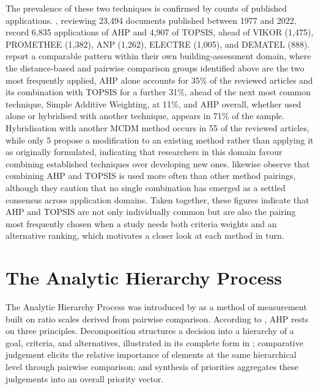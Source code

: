 The prevalence of these two techniques is confirmed by counts of published applications.
\textcite{basilio_systematic_2022}, reviewing 23{,}494 documents published between 1977 and 2022,
record 6{,}835 applications of AHP and 4{,}907 of TOPSIS, ahead of VIKOR (1{,}475), PROMETHEE
(1{,}382), ANP (1{,}262), ELECTRE (1{,}005), and DEMATEL (888).
\textcite{villalba_review_2024} report a comparable pattern within their own building-assessment
domain, where the distance-based and pairwise comparison groups identified above are the two most
frequently applied, AHP alone accounts for 35\% of the reviewed articles and its combination with
TOPSIS for a further 31\%, ahead of the next most common technique, Simple Additive Weighting, at
11\%, and AHP overall, whether used alone or hybridised with another technique, appears in 71\% of
the sample.
Hybridisation with another MCDM method occurs in 55 of the reviewed articles, while only 5 propose
a modification to an existing method rather than applying it as originally formulated, indicating
that researchers in this domain favour combining established techniques over developing new ones.
\textcite{tighnavard_balasbaneh_systematic_2025} likewise observe that combining AHP and TOPSIS is
used more often than other method pairings, although they caution that no single combination has
emerged as a settled consensus across application domains. Taken together, these figures indicate
that AHP and TOPSIS are not only individually common but are also the pairing most frequently
chosen when a study needs both criteria weights and an alternative ranking, which motivates a
closer look at each method in turn.

\section{The Analytic Hierarchy Process}\label{sec:ahp-theory}

The Analytic Hierarchy Process was introduced by \textcite{saaty_analytic_1987} as a method of
measurement built on ratio scales derived from pairwise comparison. According to \textcite{zyoud_bibliometric-based_2017},
AHP rests on three principles. Decomposition structures a decision into a hierarchy of a
goal, criteria, and alternatives, illustrated in its complete form in ;
comparative judgement elicits the relative importance of
elements at the same hierarchical level through pairwise comparison; and synthesis of priorities
aggregates these judgements into an overall priority vector.

